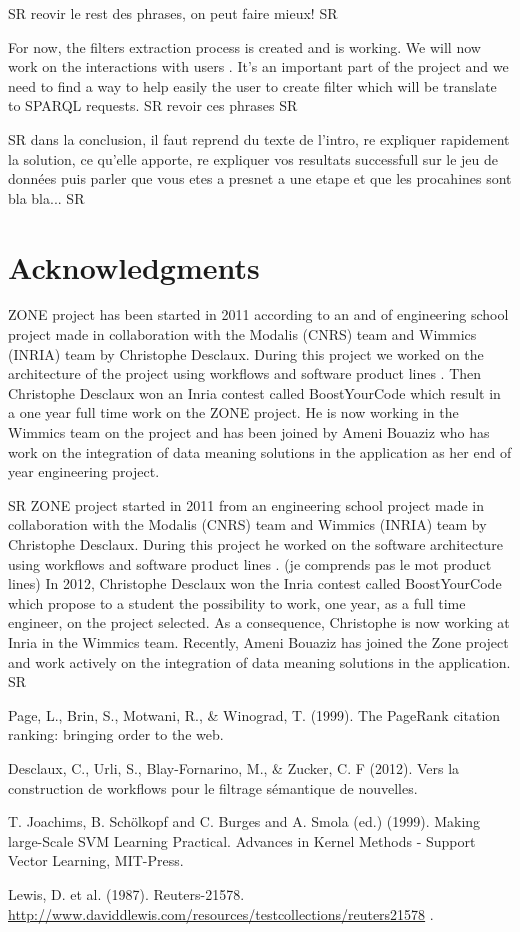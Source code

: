 \documentclass{llncs}
\begin{document}
SR reovir le rest des phrases, on peut faire mieux! SR

For now, the filters extraction process is created and is working. We will now work on the interactions with users . It's an important part of the project and we need to find a way to help easily the user to create filter which will be translate to SPARQL requests. SR revoir ces phrases SR

SR dans la conclusion, il faut reprend du texte de l'intro, re expliquer rapidement la solution, ce qu'elle apporte, re expliquer vos resultats successfull sur le jeu de données puis parler que vous etes a presnet a une etape et que les procahines sont bla bla... SR

\section{Acknowledgments}
%
ZONE project has been started in 2011 according to an and of engineering school project made in collaboration with the Modalis (CNRS) team and Wimmics (INRIA) team by Christophe Desclaux. During this project we worked on the architecture of the project using workflows and software product lines \cite{desclaux:urli}. Then Christophe Desclaux won an Inria contest called BoostYourCode which result in a one year full time work on the ZONE project. He is now working in the Wimmics team on the project and has been joined by Ameni Bouaziz who has work on the integration of data meaning solutions in the application as her end of year engineering project.

SR 
ZONE project started in 2011 from an engineering school project made in collaboration with the Modalis (CNRS) team and Wimmics (INRIA) team by Christophe Desclaux. During this project he worked on the software architecture using workflows and software product lines \cite{desclaux:urli}. (je comprends pas le mot product lines) In 2012, Christophe Desclaux won the Inria contest called BoostYourCode which propose to a student the possibility to work, one year, as a full time engineer, on the project selected. As a consequence, Christophe is now working at Inria in the Wimmics team.  Recently, Ameni Bouaziz has joined the Zone project and work actively on the integration of data meaning solutions in the application.
SR
%
%
\begin{thebibliography}{5}
%
Page, L., Brin, S., Motwani, R., \& Winograd, T. (1999). The PageRank citation ranking: bringing order to the web.

Desclaux, C., Urli, S., Blay-Fornarino, M., \& Zucker, C. F (2012). Vers la construction de workflows pour le filtrage sémantique de nouvelles.

T. Joachims, B. Schölkopf and C. Burges and A. Smola (ed.) (1999). Making large-Scale SVM Learning Practical. Advances in Kernel Methods - Support Vector Learning, MIT-Press. 

Lewis, D. et al. (1987). Reuters-21578.
\url{http://www.daviddlewis.com/resources/testcollections/reuters21578}
.
\end{thebibliography}

\clearpage
\end{document}
